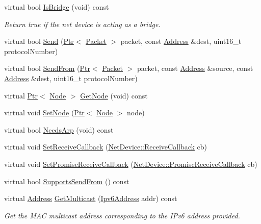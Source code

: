 \begin{DoxyCompactItemize}
virtual bool \hyperlink{classns3_1_1BridgeNetDevice_a35be2b9e5834724af90adde9fb1c2f70}{Is\+Bridge} (void) const 
\begin{DoxyCompactList}\small\item\em Return true if the net device is acting as a bridge. \end{DoxyCompactList}\item 
virtual bool \hyperlink{classns3_1_1BridgeNetDevice_ac94136d6499505f6712c939c35b97e06}{Send} (\hyperlink{classns3_1_1Ptr}{Ptr}$<$ \hyperlink{classns3_1_1Packet}{Packet} $>$ packet, const \hyperlink{classns3_1_1Address}{Address} \&dest, uint16\+\_\+t protocol\+Number)
\item 
virtual bool \hyperlink{classns3_1_1BridgeNetDevice_a7ad2acf7936e29f003c9046d76ea2099}{Send\+From} (\hyperlink{classns3_1_1Ptr}{Ptr}$<$ \hyperlink{classns3_1_1Packet}{Packet} $>$ packet, const \hyperlink{classns3_1_1Address}{Address} \&source, const \hyperlink{classns3_1_1Address}{Address} \&dest, uint16\+\_\+t protocol\+Number)
\item 
virtual \hyperlink{classns3_1_1Ptr}{Ptr}$<$ \hyperlink{classns3_1_1Node}{Node} $>$ \hyperlink{classns3_1_1BridgeNetDevice_acf2c0417701321ab9c3db740f9de5f79}{Get\+Node} (void) const 
\item 
virtual void \hyperlink{classns3_1_1BridgeNetDevice_a2720492d8546e096200dbec52105b7cd}{Set\+Node} (\hyperlink{classns3_1_1Ptr}{Ptr}$<$ \hyperlink{classns3_1_1Node}{Node} $>$ node)
\item 
virtual bool \hyperlink{classns3_1_1BridgeNetDevice_a8c2054a731287fa948512b7dce9d9d7c}{Needs\+Arp} (void) const 
\item 
virtual void \hyperlink{classns3_1_1BridgeNetDevice_abb019b6f29cbab5305195a38a415ddd1}{Set\+Receive\+Callback} (\hyperlink{classns3_1_1NetDevice_ad5e5e1ca187472bc2ba99575d8def568}{Net\+Device\+::\+Receive\+Callback} cb)
\item 
virtual void \hyperlink{classns3_1_1BridgeNetDevice_a01af49738a7fe604a04a7f3f273a1485}{Set\+Promisc\+Receive\+Callback} (\hyperlink{classns3_1_1NetDevice_a427225795919f26c414bee2ea3f31ed2}{Net\+Device\+::\+Promisc\+Receive\+Callback} cb)
\item 
virtual bool \hyperlink{classns3_1_1BridgeNetDevice_a204774b4a1fa122412c7ef273b7463a3}{Supports\+Send\+From} () const 
\item 
virtual \hyperlink{classns3_1_1Address}{Address} \hyperlink{classns3_1_1BridgeNetDevice_aa6d896c3ead0f292d2c85a5f69d5438b}{Get\+Multicast} (\hyperlink{classns3_1_1Ipv6Address}{Ipv6\+Address} addr) const 
\begin{DoxyCompactList}\small\item\em Get the M\+AC multicast address corresponding to the I\+Pv6 address provided. \end{DoxyCompactList}\end{DoxyCompactItemize}
